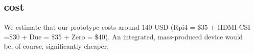 
\subsection{\device cost} We estimate that our \device prototype costs around 140 USD (Rpi4 = \$35 + HDMI-CSI =\$30 + Due = \$35 + Zero = \$40). An integrated, mass-produced device would be, of course, significantly cheaper.

